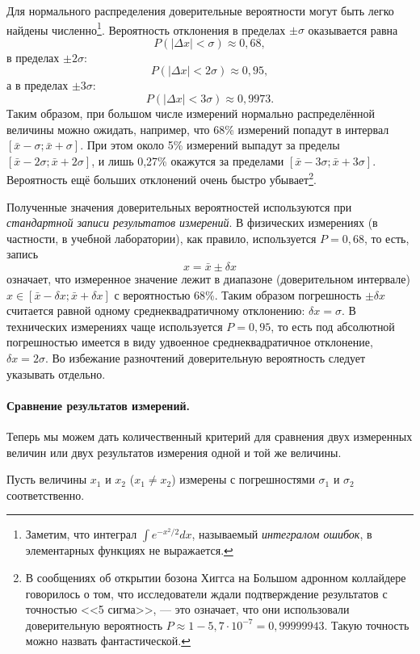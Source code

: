 Для нормального распределения доверительные вероятности могут быть
легко найдены численно\footnote{Заметим, что интеграл $\int e^{-x^{2}/2}dx$, называемый \emph{интегралом
ошибок}, в элементарных функциях не выражается.}. Вероятность отклонения в пределах $\pm\sigma$ оказывается равна
\[
P\!\left(\left|\Delta x\right|<\sigma\right)\approx0{,}68,
\]
в пределах $\pm2\sigma$:
\[
P\!\left(\left|\Delta x\right|<2\sigma\right)\approx0{,}95,
\]
а в пределах $\pm3\sigma$:
\[
P\left(\left|\Delta x\right|<3\sigma\right)\approx0{,}9973.
\]
Таким образом, при большом числе измерений нормально распределённой
величины можно ожидать, например, что 68\% измерений попадут в интервал
$\left[\bar{x}-\sigma;\bar{x}+\sigma\right]$. При этом около 5\%
измерений выпадут за пределы $\left[\bar{x}-2\sigma;\bar{x}+2\sigma\right]$,
и лишь 0,27\% окажутся за пределами $\left[\bar{x}-3\sigma;\bar{x}+3\sigma\right]$.
Вероятность ещё больших отклонений очень быстро убывает\footnote{В сообщениях об открытии бозона Хиггса на Большом адронном коллайдере
говорилось о том, что исследователи ждали подтверждение результатов
с точностью <<5 сигма>>, ---
это означает, что они использовали доверительную вероятность $P\approx1-5{,}7\cdot10^{-7}=0{,}99999943$.
Такую точность можно назвать фантастической.}.

Полученные значения доверительных вероятностей используются при \emph{стандартной
записи результатов измерений}. В физических измерениях (в частности,
в учебной лаборатории), как правило, используется $P=0{,}68$, то
есть, запись 
\[
x=\bar{x}\pm\delta x
\]
означает, что измеренное значение лежит в диапазоне (доверительном
интервале) $x\in\left[\bar{x}-\delta x;\bar{x}+\delta x\right]$ с
вероятностью 68\%. Таким образом погрешность $\pm\delta x$ считается
равной одному среднеквадратичному отклонению: $\delta x=\sigma$.
В технических измерениях чаще используется $P=0{,}95$, то есть под
абсолютной погрешностью имеется в виду удвоенное среднеквадратичное
отклонение, $\delta x=2\sigma$. Во избежание разночтений доверительную
вероятность следует указывать отдельно.

\paragraph{Сравнение результатов измерений.}

Теперь мы можем дать количественный критерий для сравнения двух измеренных
величин или двух результатов измерения одной и той же величины.

Пусть величины $x_{1}$ и $x_{2}$ ($x_{1}\ne x_{2}$) измерены с
погрешностями $\sigma_{1}$ и $\sigma_{2}$ соответственно. 

